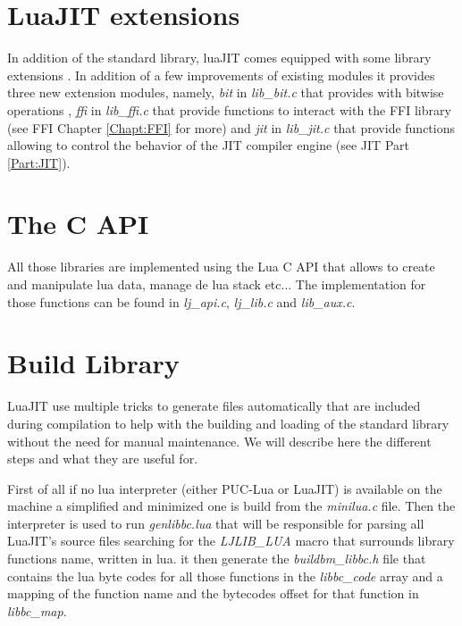 \section{LuaJIT extensions}
\label{Sec:lj-extensions}

In addition of the standard library, luaJIT comes equipped with some library
extensions \cite{extensions}. In addition of a few improvements of existing
modules it provides three new extension modules, namely, \emph{bit} in
\emph{lib\_bit.c} that provides with bitwise operations \cite{bitOp}, \emph{ffi}
in \emph{lib\_ffi.c} that provide functions to interact with the FFI library
(see FFI Chapter \ref{Chapt:FFI} for more) and \emph{jit} in \emph{lib\_jit.c}
that provide functions allowing to control the behavior of the JIT compiler
engine (see JIT Part \ref{Part:JIT}).


\section{The C API}
\label{Sec:c-api}

All those libraries are implemented using the Lua C API that allows to create
and manipulate lua data, manage de lua stack etc... The implementation for those
functions can be found in \emph{lj\_api.c}, \emph{lj\_lib.c} and \emph{lib\_aux.c}.


\section{Build Library}
\label{Sec:build-lib}

LuaJIT use multiple tricks to generate files automatically that are included
during compilation to help with the building and loading of the standard library
without the need for manual maintenance. We will describe here the different
steps and what they are useful for.

First of all if no lua interpreter
(either PUC-Lua or LuaJIT) is available on the machine a simplified and
minimized one is build from the \emph{minilua.c} file. Then the interpreter is
used to run \emph{genlibbc.lua} that will be responsible for parsing all LuaJIT's
source files searching for the \emph{LJLIB\_LUA} macro that surrounds library
functions name, written in lua. it then generate the \emph{buildbm\_libbc.h}
file that contains the lua byte codes for all those functions in the
\emph{libbc\_code} array and a mapping of the function name and the bytecodes
offset for that function in \emph{libbc\_map}.

